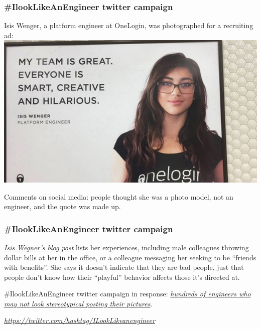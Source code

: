 \documentclass{beamer}
\begin{document}
\begin{frame}
\frametitle{\#IlookLikeAnEngineer twitter campaign}
Isis Wenger, a platform engineer at OneLogin, was photographed for a recruiting ad: 
\includegraphics[scale=0.5]{engineer.png}

Comments on social media: people thought she was a photo model, not an engineer, and the quote was made up. 
\end{frame}

\begin{frame}
\frametitle{\#IlookLikeAnEngineer twitter campaign}
{\it \href{https://medium.com/the-coffeelicious/you-may-have-seen-my-face-on-bart-8b9561003e0f}{Isis Wegner's blog post}} lists her experiences, including male colleagues throwing dollar bills at her in the office, or a colleague messaging her seeking to be ``friends with benefits''. She says it doesn't indicate that they are bad people, just that people don't know how their ``playful'' behavior affects those it's directed at. 

\vspace{0.2in}

\#IlookLikeAnEngineer twitter campaign in response: {\it \href{http://www.bbc.com/news/blogs-trending-33783007}{hundreds of engineers who may not look stereotypical posting their pictures}}.  

\vspace{0.2in}

{\it \href{https://twitter.com/hashtag/ILookLikeanengineer}{https://twitter.com/hashtag/ILookLikeanengineer}}

\end{frame}
\end{document}
